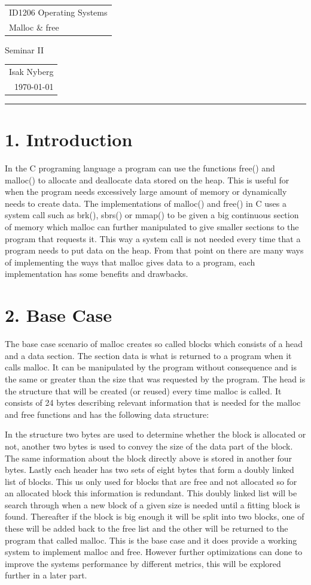 \documentclass[a4paper,11pt]{scrartcl}
\newcommand{\np}{
\newpage
{
    \raggedright
    \begin{tabular}{l}
        ID1206 Operating Systems \\
        Malloc \& free
    \end{tabular}}
    \hfill
    {
        \Large Seminar II
    }
    \hfill
    \begin{tabular}{r}
        Isak Nyberg\\
        \today{}
    \end{tabular}
    \hrule
}
\begin{document}
{
\np


\section*{1. Introduction}
In the C programing language a program can use the functions free() and malloc() to allocate and deallocate data stored on the heap. This is useful for when the program needs excessively large amount of memory or dynamically needs to create data. The implementations of malloc() and free() in C uses a system call such as brk(), sbrs() or mmap() to be given a big continuous section of memory which malloc can further manipulated to give smaller sections to the program that requests it. This way a system call is not needed every time that a program needs to put data on the heap. From that point on there are many ways of implementing the ways that malloc gives data to a program, each implementation has some benefits and drawbacks.
\section*{2. Base Case}
The base case scenario of malloc creates so called blocks which consists of a head and a data section. The section data is what is returned to a program when it calls malloc. It can be manipulated by the program without consequence and is the same or greater than the size that was requested by the program. The head is the structure that will be created (or reused) every time malloc is called. It consists of 24 bytes describing relevant information that is needed for the malloc and free functions and has the following data structure:

In the structure two bytes are used to determine whether the block is allocated or not, another two bytes is used to convey the size of the data part of the block. The same information about the block directly above is stored in another four bytes. Lastly each header has two sets of eight bytes that form a doubly linked list of blocks. This us only used for blocks that are free and not allocated so for an allocated block this information is redundant. This doubly linked list will be search through when a new block of a given size is needed until a fitting block is found. Thereafter if the block is big enough it will be split into two blocks, one of these will be added back to the free list and the other will be returned to the program that called malloc. This is the base case and it does provide a working system to implement malloc and free. However further optimizations can done to improve the systems performance by different metrics, this will be explored further in a later part.
}
\end{document}
